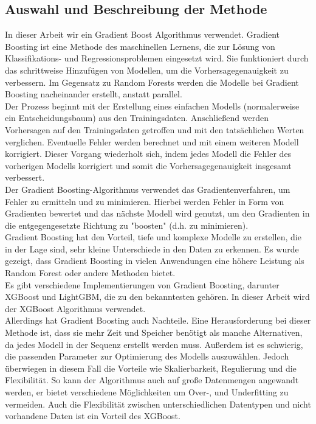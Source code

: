 \documentclass{article}
\begin{document}
\subsection{Auswahl und Beschreibung der Methode}
In dieser Arbeit wir ein Gradient Boost Algorithmus verwendet. Gradient Boosting ist eine Methode des maschinellen Lernens, die zur Lösung von Klassifikations- und Regressionsproblemen eingesetzt wird. Sie funktioniert durch das schrittweise Hinzufügen von Modellen, um die Vorhersagegenauigkeit zu verbessern. Im Gegensatz zu Random Forests werden die Modelle bei Gradient Boosting nacheinander erstellt, anstatt parallel.\\
Der Prozess beginnt mit der Erstellung eines einfachen Modells (normalerweise ein Entscheidungsbaum) aus den Trainingsdaten. Anschließend werden Vorhersagen auf den Trainingsdaten getroffen und mit den tatsächlichen Werten verglichen. Eventuelle Fehler werden berechnet und mit einem weiteren Modell korrigiert. Dieser Vorgang wiederholt sich, indem jedes Modell die Fehler des vorherigen Modells korrigiert und somit die Vorhersagegenauigkeit insgesamt verbessert.\\
Der Gradient Boosting-Algorithmus verwendet das Gradientenverfahren, um Fehler zu ermitteln und zu minimieren. Hierbei werden Fehler in Form von Gradienten bewertet und das nächste Modell wird genutzt, um den Gradienten in die entgegengesetzte Richtung zu "boosten" (d.h. zu minimieren).\\
Gradient Boosting hat den Vorteil, tiefe und komplexe Modelle zu erstellen, die in der Lage sind, sehr kleine Unterschiede in den Daten zu erkennen. Es wurde gezeigt, dass Gradient Boosting in vielen Anwendungen eine höhere Leistung als Random Forest oder andere Methoden bietet.\\
Es gibt verschiedene Implementierungen von Gradient Boosting, darunter XGBoost und LightGBM, die zu den bekanntesten gehören. In dieser Arbeit wird der XGBoost Algorithmus verwendet.\\
Allerdings hat Gradient Boosting auch Nachteile. Eine Herausforderung bei dieser Methode ist, dass sie mehr Zeit und Speicher benötigt als manche Alternativen, da jedes Modell in der Sequenz erstellt werden muss. Außerdem ist es schwierig, die passenden Parameter zur Optimierung des Modells auszuwählen. Jedoch überwiegen in diesem Fall die Vorteile wie Skalierbarkeit, Regulierung und die Flexibilität. So kann der Algorithmus auch auf große Datenmengen angewandt werden, er bietet verschiedene Möglichkeiten um Over-, und Underfitting zu vermeiden. Auch die Flexibilität zwischen unterschiedlichen Datentypen und nicht vorhandene Daten ist ein Vorteil des XGBoost.
\end{document}
